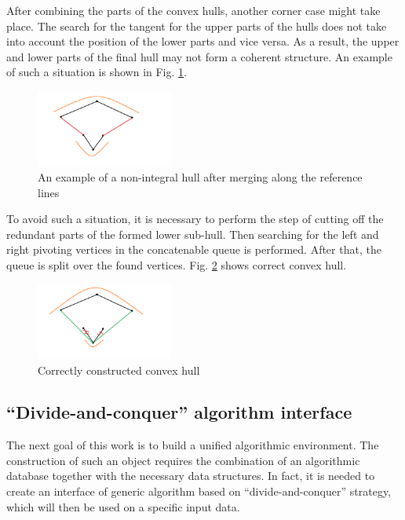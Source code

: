 \documentclass[conference]{IEEEtran}
\theoremstyle{plane}
\begin{document}
		After combining the parts of the convex hulls, another corner case might take place. The search for the tangent for the upper parts of the hulls does not take into account the position of the lower parts and vice versa. As a result, the upper and lower parts of the final hull may not form a coherent structure. An example of such a situation is shown in Fig. \ref{fig:incorect_lower_subhull}.
		
		\begin{figure}[htbp]
			\centerline{\includegraphics[width=0.4\textwidth, height=0.2\textheight]{incorect_lower_subhull}}
			\caption{An example of a non-integral hull after merging along the reference lines}
			\label{fig:incorect_lower_subhull}
		\end{figure}
		
		To avoid such a situation, it is necessary to perform the step of cutting off the redundant parts of the formed lower sub-hull. Then searching for the left and right pivoting vertices in the concatenable queue is performed. After that, the queue is split over the found vertices. Fig. \ref{fig:correct_convex_hull} shows correct convex hull.
		
		\begin{figure}[htbp]
			\centerline{\includegraphics[width=0.4\textwidth, height=0.2\textheight]{correct_convex_hull}}
			\caption{Correctly constructed convex hull}
			\label{fig:correct_convex_hull}
		\end{figure}



\subsection{``Divide-and-conquer'' algorithm interface}


		The next goal of this work is to build a unified algorithmic environment. The construction of such an object requires the combination of an algorithmic database together with the necessary data structures.  In fact, it is needed to create an interface of generic algorithm based on ``divide-and-conquer'' strategy, which will then be used on a specific input data.
		
\end{document}
